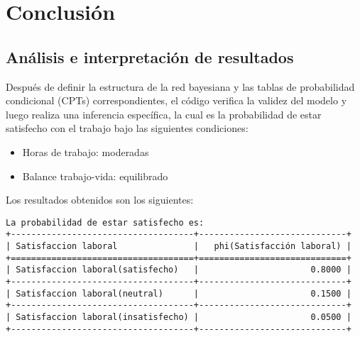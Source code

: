 \section{Conclusión}


\subsection{Análisis e interpretación de resultados}
Después de definir la estructura de la red bayesiana y las tablas de probabilidad condicional (CPTs) correspondientes, el código verifica la validez del modelo y luego realiza una inferencia específica, la cual es la probabilidad de estar satisfecho con el trabajo bajo las siguientes condiciones:

\begin{itemize}
    \item Horas de trabajo: moderadas
    \item Balance trabajo-vida: equilibrado
\end{itemize}

Los resultados obtenidos son los siguientes:

\begin{lstlisting}
La probabilidad de estar satisfecho es:
+------------------------------------+-----------------------------+
| Satisfaccion laboral               |   phi(Satisfacción laboral) |
+====================================+=============================+
| Satisfaccion laboral(satisfecho)   |                      0.8000 |
+------------------------------------+-----------------------------+
| Satisfaccion laboral(neutral)      |                      0.1500 |
+------------------------------------+-----------------------------+
| Satisfaccion laboral(insatisfecho) |                      0.0500 |
+------------------------------------+-----------------------------+
\end{lstlisting}

